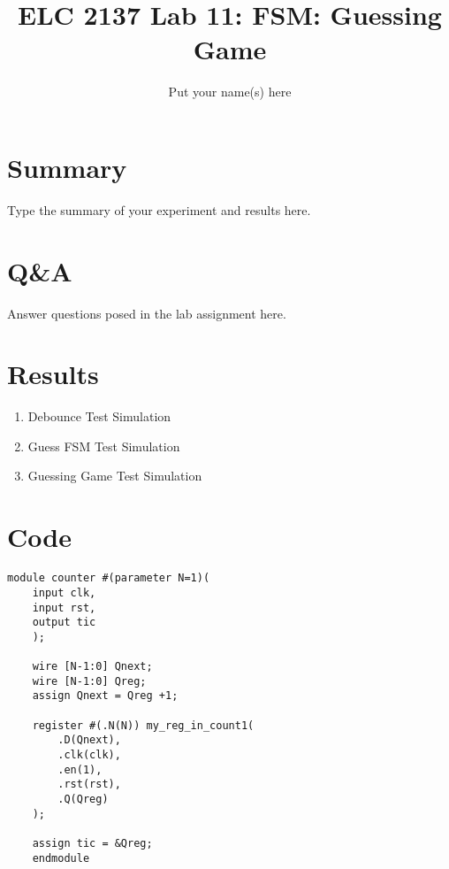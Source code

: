 \documentclass[11pt]{article}
\begin{document}
\title{ELC 2137 Lab 11: FSM: Guessing Game}
\author{Put your name(s) here}

\maketitle


\section*{Summary}

Type the summary of your experiment and results here.  


\section*{Q\&A}

Answer questions posed in the lab assignment here.


\section*{Results}

\begin{enumerate}
	
	\item Debounce Test Simulation
	
	
	\item Guess FSM Test Simulation 
	
	
	\item Guessing Game Test Simulation 
	
\end{enumerate}

\section*{Code}

\begin{lstlisting}[style=Verilog,caption=Counter, label=counter.sv]
module counter #(parameter N=1)(
	input clk,
	input rst,
	output tic
	);
	
	wire [N-1:0] Qnext;
	wire [N-1:0] Qreg;
	assign Qnext = Qreg +1;

	register #(.N(N)) my_reg_in_count1(
		.D(Qnext),
		.clk(clk),
		.en(1),
		.rst(rst),
		.Q(Qreg)
	);

	assign tic = &Qreg;
	endmodule
\end{lstlisting}
\end{document}
